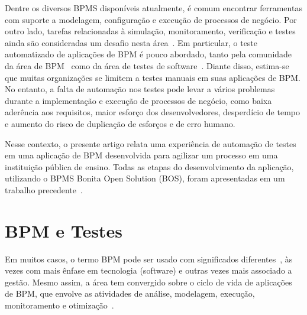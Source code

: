 \documentclass[12pt]{article}
\begin{document}
Dentre os diversos BPMS disponíveis atualmente, é comum encontrar ferramentas com suporte a modelagem, configuração e execução de processos de negócio. Por outro lado, tarefas relacionadas à simulação, monitoramento, verificação e testes ainda são consideradas um desafio nesta área~\cite{aalst2013survey}. Em particular, o teste automatizado de aplicações de BPM é pouco abordado, tanto pela comunidade da área de BPM~\cite{aalst2013survey} como da área de testes de software~\cite{graham2012experiences}. Diante disso, estima-se que muitas organizações se limitem a testes manuais em suas aplicações de BPM. No entanto, a falta de automação nos testes pode levar a vários problemas durante a implementação e execução de processos de negócio, como baixa aderência aos requisitos, maior esforço dos desenvolvedores, desperdício de tempo e aumento do risco de duplicação de esforços e de erro humano. 

Nesse contexto, o presente artigo relata uma experiência de automação de testes em uma aplicação de BPM desenvolvida para agilizar um processo em uma instituição pública de ensino. Todas as etapas do desenvolvimento da aplicação, utilizando o BPMS Bonita Open Solution (BOS), foram apresentadas em um trabalho precedente~\cite{sbsi2013}. 

\section{BPM e Testes}

Em muitos casos, o termo BPM pode ser usado com significados diferentes~\cite{acmxrds2009}, às vezes com mais ênfase em tecnologia (software) e outras vezes mais associado a gestão. Mesmo assim, a área tem convergido sobre o ciclo de vida de aplicações de BPM, que envolve as atividades de análise, modelagem, execução, monitoramento e otimização~\cite{ABPMP}. 

\end{document}
